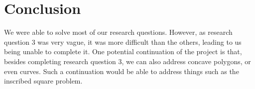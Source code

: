 \documentclass[12pt]{scrartcl}
\begin{document}
\section{Conclusion}
We were able to solve most of our research questions. However, as research question 3 was very vague, it was more difficult than the others, leading to us being unable to complete it. One potential continuation of the project is that, besides completing research question 3, we can also address concave polygons, or even curves. Such a continuation would be able to address things such as the inscribed square problem. 

\printbibliography
\end{document}
